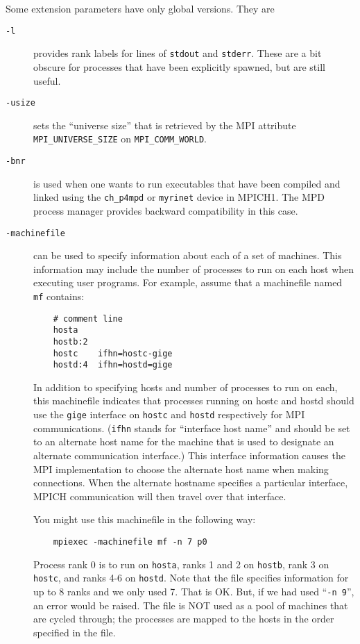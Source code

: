 \documentclass[dvipdfm,11pt]{article}
\begin{document}
Some extension parameters have only global versions.  They are
\begin{description}
\item[\texttt{-l}] provides rank labels for lines of \texttt{stdout} and
  \texttt{stderr}.  These are a bit obscure for processes that have
  been explicitly spawned, but are still useful.
\item[\texttt{-usize}] sets the ``universe size'' that is retrieved by the MPI
  attribute \\
\texttt{MPI\_UNIVERSE\_SIZE} on \texttt{MPI\_COMM\_WORLD}. 
\item[\texttt{-bnr}] is used when one wants to run executables that have
  been compiled and linked using the \texttt{ch\_p4mpd} or
  \texttt{myrinet} device in MPICH1.  The MPD process manager provides
  backward compatibility in this case.
\item[\texttt{-machinefile}] can be used to specify information
about each of a set of machines.  This information may include the
number of processes to run on each host when executing user programs.
For example, assume that a machinefile named \texttt{mf} contains:
\begin{verbatim}
    # comment line
    hosta
    hostb:2
    hostc    ifhn=hostc-gige
    hostd:4  ifhn=hostd=gige
\end{verbatim}
In addition to specifying hosts and number of processes to run on each,
this machinefile indicates that processes running on hostc and hostd
should use the \texttt{gige} interface on \texttt{hostc} and
\texttt{hostd}
respectively for MPI communications.  (\texttt{ifhn} stands for
``interface host name'' and should be set to an alternate host name for
the machine that is used to designate an alternate communication interface.)
This interface information causes the MPI implementation to choose the
alternate host name when making connections.  When the alternate
hostname specifies a particular interface, MPICH communication will then
travel over that interface.

You might use this machinefile in the following way:
\begin{verbatim}
    mpiexec -machinefile mf -n 7 p0
\end{verbatim}
Process rank 0 is to run on \texttt{hosta}, ranks 1 and 2 on
\texttt{hostb}, rank 3 on \texttt{hostc}, and ranks 4-6 on
\texttt{hostd}.  Note that the file specifies information for up to 8
ranks and we only used 7.  That is OK.  But, if we had used ``\texttt{-n
  9}'', an error would be raised.  The file is NOT used as a pool of
machines that are cycled through; the processes are mapped to the hosts
in the order specified in the file.


\end{description}
\end{document}
